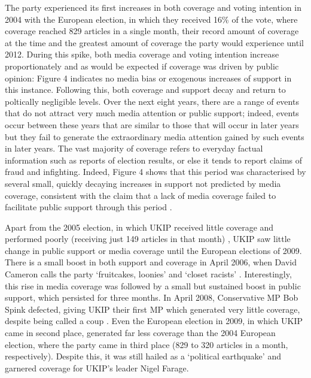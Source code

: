 \documentclass[12pt,]{article}
\begin{document}
The party experienced its first increases in both coverage and voting
intention in 2004 with the European election, in which they received
16\% of the vote, where coverage reached 829 articles in a single month,
their record amount of coverage at the time and the greatest amount of
coverage the party would experience until 2012. During this spike, both
media coverage and voting intention increase proportionately and as
would be expected if coverage was driven by public opinion: Figure 4
indicates no media bias or exogenous increases of support in this
instance. Following this, both coverage and support decay and return to
poltically negligible levels. Over the next eight years, there are a
range of events that do not attract very much media attention or public
support; indeed, events occur between these years that are similar to
those that will occur in later years but they fail to generate the
extraordinary media attention gained by such events in later years. The
vast majority of coverage refers to everyday factual information such as
reports of election results, or else it tends to report claims of fraud
and infighting. Indeed, Figure 4 shows that this period was
characterised by several small, quickly decaying increases in support
not predicted by media coverage, consistent with the claim that a lack
of media coverage failed to facilitate public support through this
period \citep{ford_strategic_2012}.

Apart from the 2005 election, in which UKIP received little coverage and
performed poorly (receiving just 149 articles in that month)
\citep{election_2005, morris_election_2005}, UKIP saw little change in
public support or media coverage until the European elections of 2009.
There is a small boost in both support and coverage in April 2006, when
David Cameron calls the party `fruitcakes, loonies' and `closet racists'
\citep{white_ukip_2006}. Interestingly, this rise in media coverage was
followed by a small but sustained boost in public support, which
persisted for three months. In April 2008, Conservative MP Bob Spink
defected, giving UKIP their first MP which generated very little
coverage, despite being called a coup \citep{winnett_tory_2008}. Even
the European election in 2009, in which UKIP came in second place,
generated far less coverage than the 2004 European election, where the
party came in third place (829 to 320 articles in a month,
respectively). Despite this, it was still hailed as a `political
earthquake' \citep{watt_european_2009} and garnered coverage for UKIP's
leader Nigel Farage.
\end{document}
